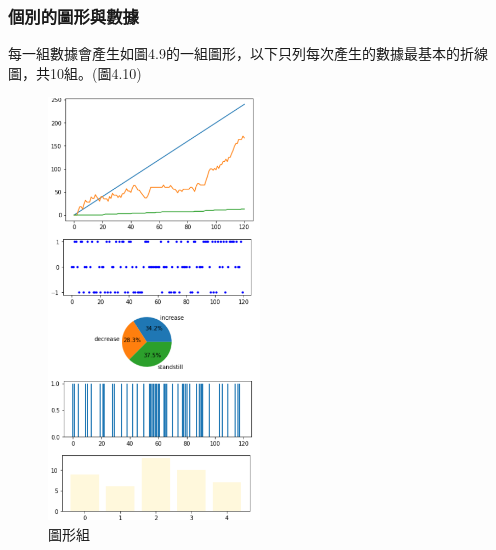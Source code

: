 \subsubsection{個別的圖形與數據}
每一組數據會產生如圖4.9的一組圖形，以下只列每次產生的數據最基本的折線圖，共10組。(圖4.10)
	\begin{figure}[H] 
	\centering 
	\includegraphics[width=0.5\textwidth]{4_5.png} 
	\caption{圖形組} 
	\label{Fig.4.5} 
	\end{figure}
